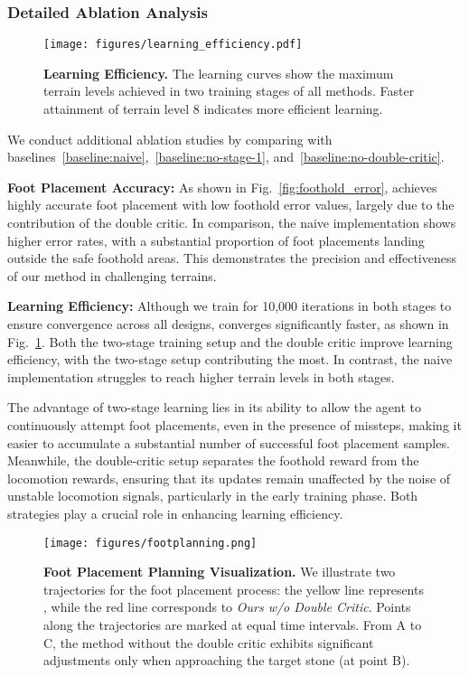 \subsubsection{Detailed Ablation Analysis}

\begin{figure}[t]
    \centering
    \texttt{[image: figures/learning\_efficiency.pdf]}
    \caption{\textbf{Learning Efficiency.} The learning curves show the maximum terrain levels achieved in two training stages of all methods. Faster attainment of terrain level 8 indicates more efficient learning.}
    \label{fig:learning_efficiency}
\end{figure}

We conduct additional ablation studies by comparing \beamdojo with baselines~\ref{baseline:naive},~\ref{baseline:no-stage-1}, and~\ref{baseline:no-double-critic}.

\textbf{Foot Placement Accuracy:} As shown in Fig.~\ref{fig:foothold_error}, \beamdojo achieves highly accurate foot placement with low foothold error values, largely due to the contribution of the double critic. In comparison, the naive implementation shows higher error rates, with a substantial proportion of foot placements landing outside the safe foothold areas. This demonstrates the precision and effectiveness of our method in challenging terrains.


\textbf{Learning Efficiency:} Although we train for 10,000 iterations in both stages to ensure convergence across all designs, \beamdojo converges significantly faster, as shown in Fig.~\ref{fig:learning_efficiency}. Both the two-stage training setup and the double critic improve learning efficiency, with the two-stage setup contributing the most. In contrast, the naive implementation struggles to reach higher terrain levels in both stages.

The advantage of two-stage learning lies in its ability to allow the agent to continuously attempt foot placements, even in the presence of missteps, making it easier to accumulate a substantial number of successful foot placement samples. Meanwhile, the double-critic setup separates the foothold reward from the locomotion rewards, ensuring that its updates remain unaffected by the noise of unstable locomotion signals, particularly in the early training phase. Both strategies play a crucial role in enhancing learning efficiency.



\begin{figure}[t]
    \centering
    \texttt{[image: figures/footplanning.png]}
    \caption{\textbf{Foot Placement Planning Visualization.} We illustrate two trajectories for the foot placement process: the yellow line represents \beamdojo, while the red line corresponds to \textit{Ours w/o Double Critic}. Points along the trajectories are marked at equal time intervals. From A to C, the method without the double critic exhibits significant adjustments only when approaching the target stone (at point B).}
    \label{fig:footplanning}
\end{figure}

